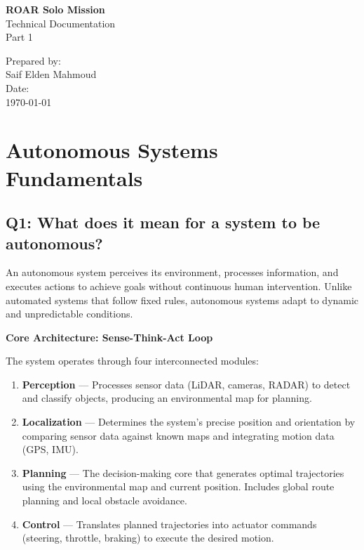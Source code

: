\documentclass[12pt,a4paper]{article}
\begin{document}
\begin{titlepage}
    \centering
    \vspace*{2cm}
    
    {\Huge\bfseries ROAR Solo Mission}\\[0.5cm]
    {\LARGE Technical Documentation}\\[0.5cm]
    {\LARGE Part 1}\\[3cm]
    
    \vfill
    
    {\Large Prepared by:}\\[0.5cm]
    {\large Saif Elden Mahmoud}\\[3cm]
    
    {\Large Date:}\\[0.5cm]
    {\large \today}
    
    \vfill
    
\end{titlepage}

\tableofcontents
\newpage

\listoffigures
\newpage

\section{Autonomous Systems Fundamentals}

\subsection{Q1: What does it mean for a system to be autonomous?}

An autonomous system perceives its environment, processes information, and executes actions to achieve goals without continuous human intervention. Unlike automated systems that follow fixed rules, autonomous systems adapt to dynamic and unpredictable conditions.

\noindent\textbf{Core Architecture: Sense-Think-Act Loop}

The system operates through four interconnected modules:

\begin{enumerate}[leftmargin=*]
    \item \textbf{Perception} — Processes sensor data (LiDAR, cameras, RADAR) to detect and classify objects, producing an environmental map for planning.
    
    \item \textbf{Localization} — Determines the system's precise position and orientation by comparing sensor data against known maps and integrating motion data (GPS, IMU).
    
    \item \textbf{Planning} — The decision-making core that generates optimal trajectories using the environmental map and current position. Includes global route planning and local obstacle avoidance.
    
    \item \textbf{Control} — Translates planned trajectories into actuator commands (steering, throttle, braking) to execute the desired motion.
\end{enumerate}
\end{document}
